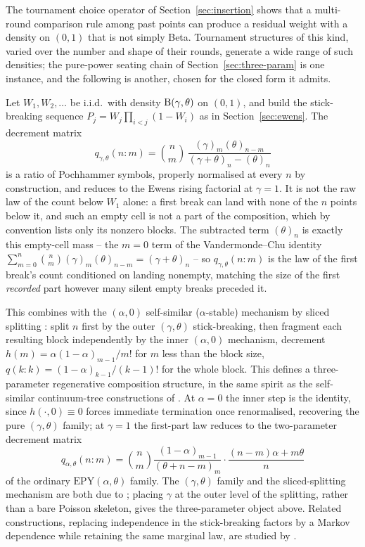 \documentclass[11pt]{article}
\theoremstyle{plain}
\theoremstyle{definition}
\begin{document}
The tournament choice operator of Section~\ref{sec:insertion} shows that a multi-round comparison rule among past points can produce a residual weight with a density on \((0,1)\) that is not simply Beta. Tournament structures of this kind, varied over the number and shape of their rounds, generate a wide range of such densities; the pure-power seating chain of Section~\ref{sec:three-param} is one instance, and the following is another, chosen for the closed form it admits.

Let \(W_1,W_2,\dots\) be i.i.d.\ with density \({\rm B}(\gamma,\theta)\) on \((0,1)\), and build the stick-breaking sequence \(P_j=W_j\prod_{i<j}(1-W_i)\) as in Section~\ref{sec:ewens}. The decrement matrix
\[
q_{\gamma,\theta}(n:m)=\binom nm\,\frac{(\gamma)_m(\theta)_{n-m}}{(\gamma+\theta)_n-(\theta)_n}
\]
is a ratio of Pochhammer symbols, properly normalised at every \(n\) by construction, and reduces to the Ewens rising factorial at \(\gamma=1\). It is not the raw law of the count below \(W_1\) alone: a first break can land with none of the \(n\) points below it, and such an empty cell is not a part of the composition, which by convention lists only its nonzero blocks. The subtracted term \((\theta)_n\) is exactly this empty-cell mass -- the \(m=0\) term of the Vandermonde--Chu identity \(\sum_{m=0}^n\binom nm(\gamma)_m(\theta)_{n-m}=(\gamma+\theta)_n\) -- so \(q_{\gamma,\theta}(n:m)\) is the law of the first break's count conditioned on landing nonempty, matching the size of the first \emph{recorded} part however many silent empty breaks preceded it.

This combines with the \((\alpha,0)\) self-similar (\(\alpha\)-stable) mechanism by sliced splitting \cite{GnedinIksanovMarynych2010,gnedin2005markov}: split \(n\) first by the outer \((\gamma,\theta)\) stick-breaking, then fragment each resulting block independently by the inner \((\alpha,0)\) mechanism, decrement \(h(m)=\alpha(1-\alpha)_{m-1}/m!\) for \(m\) less than the block size, \(q(k:k)=(1-\alpha)_{k-1}/(k-1)!\) for the whole block. This defines a three-parameter regenerative composition structure, in the same spirit as the self-similar continuum-tree constructions of \cite{pitman2009regenerative}. At \(\alpha=0\) the inner step is the identity, since \(h(\cdot,0)\equiv0\) forces immediate termination once renormalised, recovering the pure \((\gamma,\theta)\) family; at \(\gamma=1\) the first-part law reduces to the two-parameter decrement matrix
\[
q_{\alpha,\theta}(n:m)=\binom nm\frac{(1-\alpha)_{m-1}}{(\theta+n-m)_m}\cdot\frac{(n-m)\alpha+m\theta}n
\]
of the ordinary \(\mathrm{EPY}(\alpha,\theta)\) family. The \((\gamma,\theta)\) family and the sliced-splitting mechanism are both due to \cite{GnedinIksanovMarynych2010}; placing \(\gamma\) at the outer level of the splitting, rather than a bare Poisson skeleton, gives the three-parameter object above. Related constructions, replacing independence in the stick-breaking factors by a Markov dependence while retaining the same marginal law, are studied by \cite{PitmanTran2015}.
\end{document}
